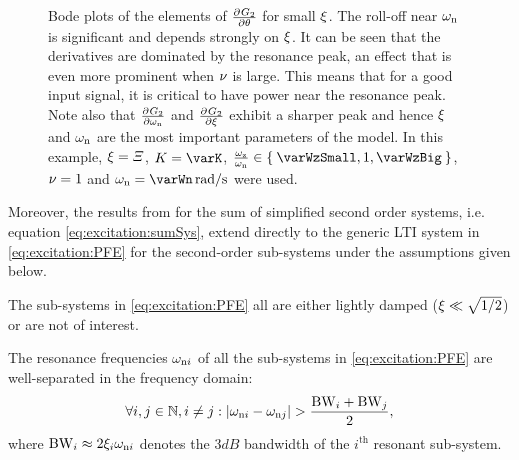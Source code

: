 \begin{figure}
  \centering
  \setlength{}
  \setlength\figureheight{\figurewidth}
  
  \caption[Derivatives of a second-order sub-system towards each of its parameters.]{Bode plots of the elements of $\PartialDerivative{G_2}{\theta}$ for small $\damping$. 
  The roll-off near $\wn$ is significant and depends strongly on $\damping$.
  It can be seen that the derivatives are dominated by the resonance peak, an effect that is even more prominent when $\multiplicity$ is large.
  This means that for a good input signal, it is critical to have power near the resonance peak. 
  Note also that $\PartialDerivative{G_2}{\wn}$ and $\PartialDerivative{G_2}{\damping}$ exhibit a sharper peak and hence $\damping$ and $\wn$ are the most important parameters of the model.
  In this example, $\damping = \varXi$, $K = \varK$, $\frac{\wz}{\wn} \in \Set{\varWzSmall, 1, \varWzBig}$, $\multiplicity=1$ and $\wn = \varWn \unit{rad/s}$ were used.
}
\label{fig:excitation:derivatives}
\end{figure}

Moreover, the results from  for the sum of simplified second order systems, i.e. equation \eqref{eq:excitation:sumSys}, extend directly to the generic \gls{LTI} system in \eqref{eq:excitation:PFE} for the second-order sub-systems under the assumptions given below.

\begin{assumption} 
The sub-systems in \eqref{eq:excitation:PFE} all are either lightly damped ($\damping \ll \sqrt{1/2}$) or are not of interest.
\end{assumption}

\begin{assumption}
The resonance frequencies $\wn[i]$ of all the sub-systems in \eqref{eq:excitation:PFE} are well-separated in the frequency domain:
\begin{equation}
  \forall i,j \in \NaturalNumbers, i \neq j : \abs{\wn[i] - \wn[j]} >  \frac{\BW_i + \BW_j}{2},
\end{equation}
where $\BW_{i} \approx 2 \damping[i]\wn[i]$ denotes the $3\unit{dB}$ bandwidth of the $i^{\text{th}}$ resonant sub-system. 
\end{assumption}

